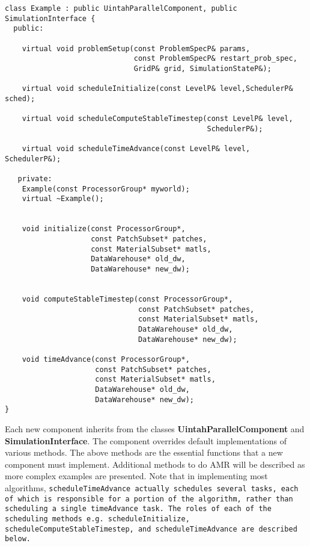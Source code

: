 \begin{Verbatim}[fontsize=\footnotesize]
class Example : public UintahParallelComponent, public SimulationInterface {
  public:

    virtual void problemSetup(const ProblemSpecP& params, 
                              const ProblemSpecP& restart_prob_spec, 
                              GridP& grid, SimulationStateP&);

    virtual void scheduleInitialize(const LevelP& level,SchedulerP& sched);
                                    
    virtual void scheduleComputeStableTimestep(const LevelP& level, 
                                               SchedulerP&);
                                               
    virtual void scheduleTimeAdvance(const LevelP& level, SchedulerP&);

   private:
    Example(const ProcessorGroup* myworld);
    virtual ~Example();


    void initialize(const ProcessorGroup*,
                    const PatchSubset* patches, 
                    const MaterialSubset* matls,
                    DataWarehouse* old_dw, 
                    DataWarehouse* new_dw);
                    
                    
    void computeStableTimestep(const ProcessorGroup*,
                               const PatchSubset* patches,
                               const MaterialSubset* matls,
                               DataWarehouse* old_dw,
                               DataWarehouse* new_dw);
                               
    void timeAdvance(const ProcessorGroup*,
                     const PatchSubset* patches,
                     const MaterialSubset* matls,
                     DataWarehouse* old_dw,
                     DataWarehouse* new_dw);
}
\end{Verbatim}


Each new component inherits from the classes
\textbf{UintahParallelComponent} and \textbf{SimulationInterface}.
The component overrides default implementations of various methods.
The above methods are the essential functions that a new component
must implement.  Additional methods to do AMR will be described as
more complex examples are presented.  Note that in implementing most
algorithms, \tt scheduleTimeAdvance \normalfont actually
schedules several tasks, each of which is responsible for a portion
of the algorithm, rather than scheduling a single \tt timeAdvance \normalfont
task.
The roles of each of the scheduling methods e.g. \texttt{scheduleInitialize},
\texttt{scheduleComputeStableTimestep}, and \texttt{scheduleTimeAdvance}
are described below. 

